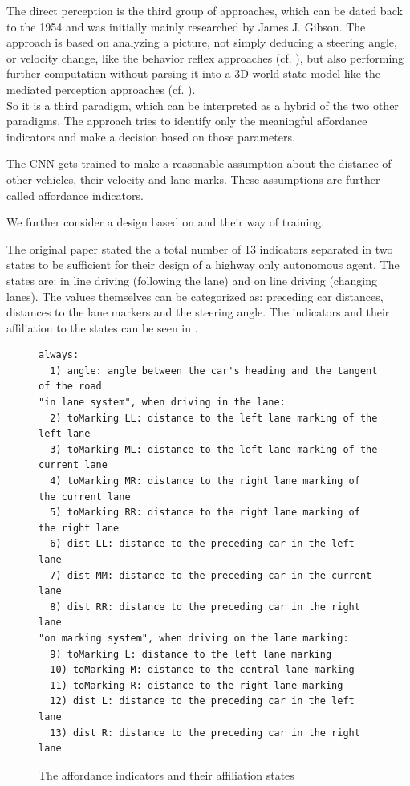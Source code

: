 The direct perception is the third group of approaches, which can be dated back to the 1954 and was initially mainly researched by James J. Gibson. \cite{gibson1954theory} The approach is based on analyzing a picture, not simply deducing a steering angle, or velocity change, like the behavior reflex approaches (cf. ), but also performing further computation without parsing it into a 3D world state model like the mediated perception approaches (cf. ). \cite{chen2015deepdriving}\\
So it is a third paradigm, which can be interpreted as a hybrid of the two other paradigms. The approach tries to identify only the meaningful affordance indicators and make a decision based on those parameters. 

The CNN gets trained to make a reasonable assumption about the distance of other vehicles, their velocity and lane marks. These assumptions are further called affordance indicators.

We further consider a design based on \cite{chen2015deepdriving} and their way of training.

The original paper \cite{chen2015deepdriving} stated the a total number of 13 indicators separated in two states to be sufficient for their design of a highway only autonomous agent. The states are: in line driving (following the lane) and on line driving (changing lanes). The values themselves can be categorized as: preceding car distances, distances to the lane markers and the steering angle. The indicators and their affiliation to the states can be seen in .

\begin{figure}
\centering
\todoLine
\begin{lstlisting}
always:
  1) angle: angle between the car's heading and the tangent of the road
"in lane system", when driving in the lane:
  2) toMarking LL: distance to the left lane marking of the left lane
  3) toMarking ML: distance to the left lane marking of the current lane
  4) toMarking MR: distance to the right lane marking of the current lane
  5) toMarking RR: distance to the right lane marking of the right lane
  6) dist LL: distance to the preceding car in the left lane
  7) dist MM: distance to the preceding car in the current lane
  8) dist RR: distance to the preceding car in the right lane
"on marking system", when driving on the lane marking:
  9) toMarking L: distance to the left lane marking
  10) toMarking M: distance to the central lane marking
  11) toMarking R: distance to the right lane marking
  12) dist L: distance to the preceding car in the left lane
  13) dist R: distance to the preceding car in the right lane
\end{lstlisting}

\todoLine
\caption{The affordance indicators and their affiliation states}
\label{lst: affordance indicators}
\end{figure}

